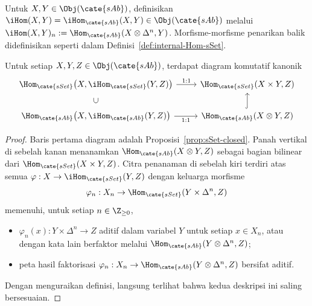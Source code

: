 \begin{definition}
	Untuk $X,Y\in\Obj(\cate{sAb})$, definisikan
	$\iHom(X,Y)=\iHom_{\cate{sAb}}(X,Y)\in\Obj(\cate{sAb})$ melalui
	$\iHom(X,Y)_n:=\Hom_{\cate{sAb}}(X\otimes\Delta^n,Y)$.
	Morfisme-morfisme penarikan balik didefinisikan seperti dalam
	Definisi~\ref{def:internal-Hom-sSet}.
\end{definition}

\begin{proposition}\label{prop:sAb-closed}
	Untuk setiap $X,Y,Z\in\Obj(\cate{sAb})$, terdapat diagram komutatif kanonik
	\[\begin{tikzcd}
		\Hom_{\cate{sSet}}\bigl(X,\iHom_{\cate{sSet}}(Y,Z)\bigr)
		\arrow[r,"1:1"]
		&\Hom_{\cate{sSet}}(X\times Y,Z)\\
		\Hom_{\cate{sAb}}\bigl(X,\iHom_{\cate{sAb}}(Y,Z)\bigr)
		\arrow[r,"1:1"']
		\arrow[phantom,u,"\subset" description,sloped]
		&\Hom_{\cate{sAb}}(X\otimes Y,Z)\arrow[hookrightarrow,u]
	\end{tikzcd}\]
\end{proposition}
\begin{proof}
	Baris pertama diagram adalah Proposisi~\ref{prop:sSet-closed}. Panah
	vertikal di sebelah kanan menanamkan
	$\Hom_{\cate{sAb}}(X\otimes Y,Z)$ sebagai bagian bilinear dari
	$\Hom_{\cate{sSet}}(X\times Y,Z)$. Citra penanaman di sebelah kiri terdiri
	atas semua $\varphi:X\to\iHom_{\cate{sSet}}(Y,Z)$ dengan keluarga
	morfisme
	\[
	\varphi_n:X_n\to\Hom_{\cate{sSet}}(Y\times\Delta^n,Z)
	\]
	memenuhi, untuk setiap $n\in\Z_{\geq0}$,
	\begin{itemize}
		\item $\varphi_n(x):Y\times\Delta^n\to Z$ aditif dalam variabel $Y$
		untuk setiap $x\in X_n$, atau dengan kata lain berfaktor melalui
		$\Hom_{\cate{sAb}}(Y\otimes\Delta^n,Z)$;
		\item peta hasil faktorisasi
		$\varphi_n:X_n\to\Hom_{\cate{sAb}}(Y\otimes\Delta^n,Z)$ bersifat
		aditif.
	\end{itemize}
	Dengan menguraikan definisi, langsung terlihat bahwa kedua deskripsi ini
	saling bersesuaian.
\end{proof}

